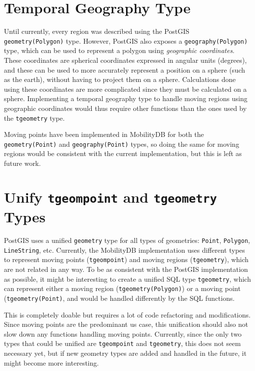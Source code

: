 
\section{Temporal Geography Type}
\label{section:tgeography}

Until currently, every region was described using the PostGIS \lstinline{geometry(Polygon)} type. However, PostGIS also exposes a \lstinline{geography(Polygon)} type, which can be used to represent a polygon using \textit{geographic coordinates}. These coordinates are spherical coordinates expressed in angular units (degrees), and these can be used to more accurately represent a position on a sphere (such as the earth), without having to project them on a sphere. Calculations done using these coordinates are more complicated since they must be calculated on a sphere. Implementing a temporal geography type to handle moving regions using geographic coordinates would thus require other functions than the ones used by the \lstinline+tgeometry+ type. 

Moving points have been implemented in MobilityDB for both the \lstinline{geometry(Point)} and \lstinline{geography(Point)} types, so doing the same for moving regions would be consistent with the current implementation, but this is left as future work.

\section{Unify \texttt{tgeompoint} and \texttt{tgeometry} Types}
\label{section:tgeompoint}

PostGIS uses a unified \lstinline{geometry} type for all types of geometries: \lstinline+Point+, \lstinline+Polygon+, \lstinline+LineString+, etc. Currently, the MobilityDB implementation uses different types to represent moving points (\lstinline{tgeompoint}) and moving regions (\lstinline{tgeometry}), which are not related in any way. To be as consistent with the PostGIS implementation as possible, it might be interesting to create a unified SQL type \lstinline{tgeometry}, which can represent either a moving region (\lstinline{tgeometry(Polygon)}) or a moving point (\lstinline{tgeometry(Point)}, and would be handled differently by the SQL functions.

This is completely doable but requires a lot of code refactoring and modifications. Since moving points are the predominant us case, this unification should also not slow down any functions handling moving points. Currently, since the only two types that could be unified are \lstinline{tgeompoint} and \lstinline{tgeometry}, this does not seem necessary yet, but if new geometry types are added and handled in the future, it might become more interesting.